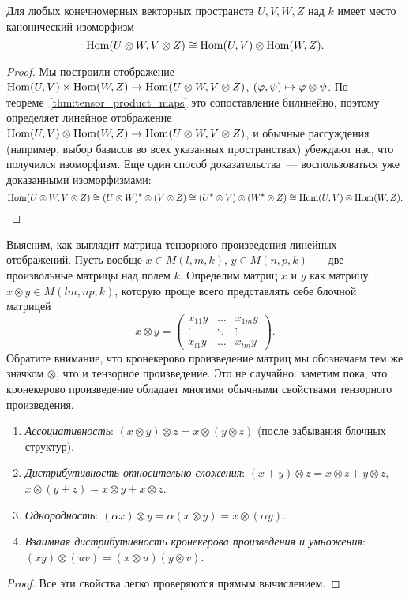 \begin{theorem}
Для любых конечномерных векторных пространств $U,V,W,Z$ над $k$ имеет
место канонический изоморфизм
$$\operatorname{Hom}(U\otimes W,V\otimes Z) \cong \operatorname{Hom}(U,V)\otimes\operatorname{Hom}(W,Z).$$
\end{theorem}
\begin{proof}
Мы построили отображение
$\operatorname{Hom}(U,V)\times\operatorname{Hom}(W,Z)\to\operatorname{Hom}(U\otimes W,V\otimes Z)$,
$(\varphi,\psi)\mapsto\varphi\otimes\psi$.
По теореме~\ref{thm:tensor_product_maps} это сопоставление билинейно,
поэтому определяет линейное отображение
$\operatorname{Hom}(U,V)\otimes\operatorname{Hom}(W,Z) \to \operatorname{Hom}(U\otimes W,V\otimes Z)$, и обычные
рассуждения (например, выбор базисов во всех указанных пространствах)
убеждают нас, что получился изоморфизм.
Еще один способ доказательства~--- воспользоваться уже доказанными
изоморфизмами:
$$\operatorname{Hom}(U\otimes W,V\otimes Z) \cong (U\otimes W)^*\otimes (V\otimes Z)
\cong (U^*\otimes V)\otimes (W^*\otimes Z) \cong
\operatorname{Hom}(U,V)\otimes\operatorname{Hom}(W,Z).$$
\end{proof}

Выясним, как выглядит матрица тензорного произведения линейных
отображений.
Пусть вообще $x\in M(l,m,k)$, $y\in M(n,p,k)$~--- две произвольные
матрицы над полем $k$. Определим  матриц
$x$ и $y$ как матрицу $x\otimes y\in M(lm,np,k)$, которую проще всего
представлять себе блочной матрицей
$$
x\otimes y = \begin{pmatrix}x_{11}y & \dots & x_{1m}y\\
\vdots & \ddots & \vdots\\
x_{l1}y & \dots & x_{lm}y\end{pmatrix}.
$$
Обратите внимание, что кронекерово произведение матриц мы обозначаем
тем же значком $\otimes$, что и тензорное произведение. Это не
случайно: заметим пока, что кронекерово произведение обладает многими
обычными свойствами тензорного произведения.

\begin{proposition}\label{prop:kronecker_product}
\hspace{1em}
\begin{enumerate}
\item {\em Ассоциативность}: $(x\otimes y)\otimes z = x\otimes
  (y\otimes z)$ (после забывания блочных структур).
\item {\em Дистрибутивность относительно сложения}: $(x+y)\otimes z =
  x\otimes z + y\otimes z$, $x\otimes (y+z) = x\otimes y + x\otimes
  z$.
\item {\em Однородность}: $(\alpha x)\otimes y = \alpha (x\otimes y) =
  x\otimes (\alpha y)$.
\item {\em Взаимная дистрибутивность кронекерова произведения и
    умножения}: $(xy)\otimes (uv) = (x\otimes u)(y\otimes v)$.
\end{enumerate}
\end{proposition}
\begin{proof}
Все эти свойства легко проверяются прямым вычислением.
\end{proof}

